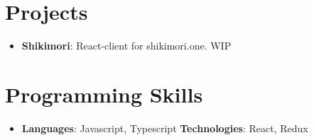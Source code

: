 \documentclass[letterpaper,11pt]{article}
\newcommand{\resumeItem}[2]{
  \item\small{
    \textbf{#1}{: #2 \vspace{-2pt}}
  }
}
\newcommand{\resumeSubItem}[2]{\resumeItem{#1}{#2}\vspace{-4pt}}
\newcommand{\resumeSubHeadingListStart}{\begin{itemize}[leftmargin=*]}
\newcommand{\resumeSubHeadingListEnd}{\end{itemize}}
\begin{document}
\section{Projects}
  \resumeSubHeadingListStart
    \resumeSubItem{Shikimori}
      {React-client for shikimori.one. WIP}
  \resumeSubHeadingListEnd

%
\section{Programming Skills}
 \resumeSubHeadingListStart
   \item{
     \textbf{Languages}{: Javascript, Typescript}
     \hfill
     \textbf{Technologies}{: React, Redux}
   }
 \resumeSubHeadingListEnd


\end{document}
